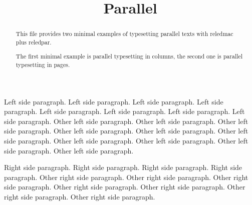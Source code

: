 \documentclass{article}
\begin{document}
\date{}
\title{Parallel}
\maketitle

\begin{abstract}
This file provides two minimal examples of typesetting parallel texts with reledmac plus reledpar. 

The first minimal example is parallel typesetting in columns, the second one is parallel typesetting in pages.
\end{abstract}


\begin{pairs}
    \begin{Leftside}
        \beginnumbering
            \pstart
                Left side paragraph. Left side paragraph. Left side paragraph. Left side paragraph. Left side paragraph. Left side paragraph. Left side paragraph. Left side paragraph.
            \pend
            \pstart
                Other left side paragraph.  Other left side paragraph.  Other left side paragraph.  Other left side paragraph.  Other left side paragraph.  Other left side paragraph.  Other left side paragraph.  Other left side paragraph.  Other left side paragraph.  Other left side paragraph.
            \pend
        \endnumbering
    \end{Leftside}
    \begin{Rightside}
        \beginnumbering
            \pstart
                Right side paragraph. Right side paragraph. Right side paragraph. Right side paragraph.
            \pend
            \pstart
                Other right side paragraph. Other right side paragraph. Other right side paragraph. Other right side paragraph. Other right side paragraph. Other right side paragraph. Other right side paragraph.
            \pend
        \endnumbering
    \end{Rightside}

\end{pairs} 
\Columns
\end{document}
